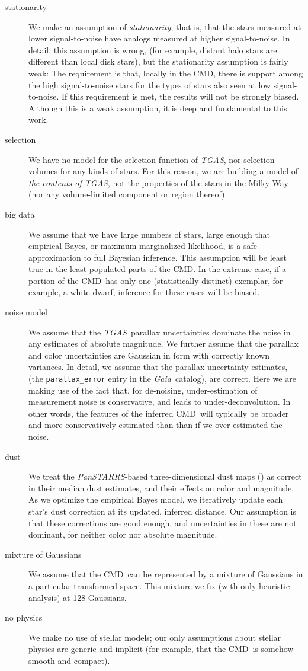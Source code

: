 \documentclass[modern]{aastex61}
\newcommand{\acronym}[1]{{\small{#1}}}
\newcommand{\project}[1]{\textsl{#1}}
\newcommand{\tgas}{\project{\acronym{TGAS}}}
\newcommand{\gaia}{\project{Gaia}}
\newcommand{\panstarrs}{\project{Pan\acronym{STARRS}}}
\newcommand{\cmd}{\acronym{CMD}}
\begin{document}
\begin{description}
\item[stationarity] We make an assumption of \emph{stationarity}; that is, that the
  stars measured at lower signal-to-noise have analogs measured at
  higher signal-to-noise.
  In detail, this assumption is wrong, (for example, distant halo stars are different than local
  disk stars), but the stationarity assumption is fairly weak:
  The requirement is that, locally in the \cmd, there is
  support among the high signal-to-noise stars for the types
  of stars also seen at low signal-to-noise.
  If this requirement is met, the results will not be
  strongly biased. Although this is a weak assumption, it is deep and fundamental to this
  work.
\item[selection] We have no model for the selection function of \tgas,
  nor selection volumes for any kinds of stars.
  For this reason, we are building a model of \emph{the contents of \tgas}, not the
  properties of the stars in the Milky Way (nor any volume-limited component or region
  thereof).
\item[big data] We assume that we have large numbers of stars, large enough that
  empirical Bayes, or maximum-marginalized likelihood, is a safe
  approximation to full Bayesian inference. This assumption will be
  least true in the least-populated parts of the \cmd. In the extreme
  case, if a portion of the \cmd\ has only one (statistically distinct)
  exemplar, for example, a white dwarf, inference for these cases will be biased.
\item[noise model] We assume that the \tgas\ parallax uncertainties dominate the
  noise in any estimates of absolute magnitude. We further assume that
  the parallax and color uncertainties are Gaussian in form with
  correctly known variances. In detail, we assume that the parallax uncertainty estimates,
  (the \texttt{parallax{\_}error} entry in the \gaia\ catalog), are correct.
  Here we are making use of the fact that, for
  de-noising, under-estimation of measurement noise is conservative, and leads to under-deconvolution. In other words, the features of the inferred \cmd\ will typically be broader and more conservatively estimated than than if we over-estimated the noise.
\item[dust] We treat the \panstarrs-based three-dimensional dust maps (\citealt{green15})
  as correct in their median dust estimates, and their
  effects on color and magnitude. As we optimize the empirical Bayes model, we iteratively update each star's
  dust correction at its updated, inferred distance. Our assumption is that these corrections are
  good enough, and uncertainties in these are not dominant, for neither
  color nor absolute magnitude.
\item[mixture of Gaussians] We assume that the \cmd\ can be represented by a mixture of
  Gaussians in a particular transformed space. This mixture we fix
  (with only heuristic analysis) at 128 Gaussians.
\item[no physics] We make no use of stellar models; our only assumptions about
  stellar physics are generic and implicit (for example, that the
  \cmd\ is somehow smooth and compact).
\end{description}
\end{document}
